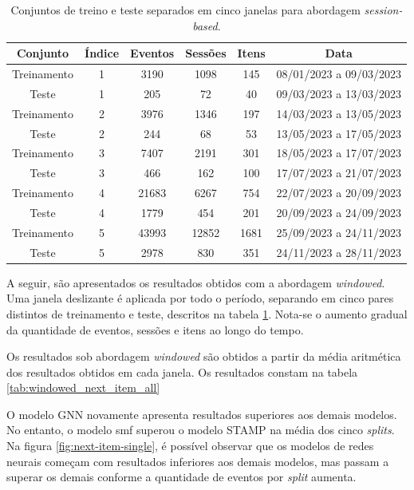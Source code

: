 \begin{table}[htbp]
  \centering
  \begin{tabular}{|c|c|c|c|c|c|}
    \hline
    Conjunto & Índice & Eventos & Sessões & Itens & Data\\
    \hline
    Treinamento & 1 & 3190 & 1098 & 145 & 08/01/2023 a 09/03/2023\\
    \hline
    Teste & 1 & 205 & 72 & 40 & 09/03/2023 a 13/03/2023\\
    \hline
    Treinamento & 2 & 3976 & 1346 & 197 & 14/03/2023 a 13/05/2023\\
    \hline
    Teste & 2 & 244 & 68 & 53 & 13/05/2023 a 17/05/2023\\
    \hline
    Treinamento & 3 & 7407 & 2191 & 301 & 18/05/2023 a 17/07/2023\\
    \hline
    Teste & 3 & 466 & 162 & 100 & 17/07/2023 a 21/07/2023\\
    \hline
    Treinamento & 4 & 21683 & 6267 & 754 & 22/07/2023 a 20/09/2023\\
    \hline
    Teste & 4 & 1779 & 454 & 201 & 20/09/2023 a 24/09/2023\\
    \hline
    Treinamento & 5 & 43993 & 12852 & 1681 & 25/09/2023 a 24/11/2023\\
    \hline
    Teste & 5 & 2978 & 830 & 351 & 24/11/2023 a 28/11/2023\\
    \hline
  \end{tabular}
  \caption{Conjuntos de treino e teste separados em cinco janelas para abordagem \textit{session-based}.}
  \label{tab:windowed_data}
\end{table}

A seguir, são apresentados os resultados obtidos com a abordagem
\textit{windowed}. Uma janela deslizante é aplicada por todo o período,
separando em cinco pares distintos de treinamento e teste, descritos na tabela
\ref{tab:windowed_data}. Nota-se o aumento gradual da quantidade de eventos,
sessões e itens ao longo do tempo.

Os resultados sob abordagem \textit{windowed} são obtidos a partir da média
aritmética dos resultados obtidos em cada janela. Os resultados constam na
tabela \ref{tab:windowed_next_item_all}




O modelo GNN novamente apresenta resultados superiores aos demais modelos. No
entanto, o modelo smf superou o modelo STAMP na média dos cinco \textit{splits}.
Na figura \ref{fig:next-item-single}, é possível observar que os modelos de
redes neurais começam com resultados inferiores aos demais modelos, mas passam a
superar os demais conforme a quantidade de eventos por \textit{split} aumenta.

